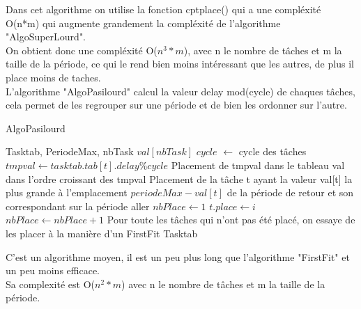 \documentclass[11pt]{article}
\begin{document}
Dans cet algorithme on utilise la fonction cptplace() qui a une compléxité O(n*m) qui augmente grandement la compléxité de l'algorithme "AlgoSuperLourd".\\
On obtient donc une compléxité O($n^3*m$), avec n le nombre de tâches et m la taille de la période, ce qui le rend bien moins intéressant que les autres, de plus il place moins de taches.\\

\newpage
L'algorithme "AlgoPasilourd" calcul la valeur delay mod(cycle) de chaques tâches, cela permet de les regrouper sur une période et de bien les ordonner sur l'autre.\\
\begin{algorithm}
    \caption{AlgoPasilourd}
    \begin{algorithmic}
    \REQUIRE Tasktab, PeriodeMax, nbTask
    \STATE $val[nbTask]$
    \STATE $cycle$ $\leftarrow$ cycle des tâches
        \STATE $tmpval \leftarrow tasktab.tab[t].delay\%cycle$
        \STATE Placement de tmpval dans le tableau val dans l'ordre croissant des tmpval
    \ENDFOR
    \STATE Placement de la tâche t ayant la valeur val[t] la plus grande à l'emplacement $periodeMax - val[t]$ de la période de retour et son correspondant sur la période aller
    \STATE $nbPlace \leftarrow 1$
                        \STATE $t.place \leftarrow i$
                    \ENDIF
                \ENDFOR
                \STATE $nbPlace \leftarrow nbPlace+1$
            \ENDIF
        \ENDFOR
    \ENDFOR
    \STATE Pour toute les tâches qui n'ont pas été placé, on essaye de les placer à la manière d'un FirstFit
    \RETURN Tasktab
    \end{algorithmic}
\end{algorithm}

C'est un algorithme moyen, il est un peu plus long que l'algorithme "FirstFit" et un peu moins efficace.\\
Sa complexité est O($n^2*m$) avec n le nombre de tâches et m la taille de la période.\\ 
\end{document}
